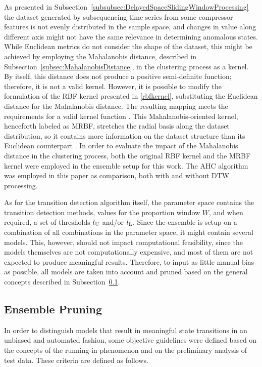 \documentclass[preprint,11pt,number]{elsarticle}
\begin{document}
As presented in Subsection~\ref{subsubsec:DelayedSpaceSlidingWindowProcessing} the dataset generated by subsequencing time series from some compressor features is not evenly distributed in the sample space, and changes in value along different axis might not have the same relevance in determining anomalous states. While Euclidean metrics do not consider the shape of the dataset, this might be achieved by employing the Mahalanobis distance, described in Subsection~\ref{subsec:MahalanobisDistance}, in the clustering process as a kernel. By itself, this distance does not produce a positive semi-definite function; therefore, it is not a valid kernel. However, it is possible to modify the formulation of the RBF kernel presented in \eqref{rbfkernel}, substituting the Euclidean distance for the Mahalanobis distance. The resulting mapping meets the requirements for a valid kernel function \cite{Wang2007}. This Mahalanobis-oriented kernel, henceforth labeled as MRBF, stretches the radial basis along the dataset distribution, so it contains more information on the dataset structure than its Euclidean counterpart \cite{Wang2007}. In order to evaluate the impact of the Mahalanobis distance in the clustering process, both the original RBF kernel and the MRBF kernel were employed in the ensemble setup for this work. The AHC algorithm was employed in this paper as comparison, both with and without DTW processing.

As for the transition detection algorithm itself, the parameter space contains the transition detection methods, values for the proportion window $W$, and when required, a set of thresholds $l\textsubscript{U}$ and/or $l\textsubscript{L}$. Since the ensemble is setup on a combination of all combinations in the parameter space, it might contain several models. This, however, should not impact computational feasibility, since the models themselves are not computationally expensive, and most of them are not expected to produce meaningful results. Therefore, to input as little manual bias as possible, all models are taken into account and pruned based on the general concepts described in Subsection~\ref{subsec:EnsemblePruning}.

\subsection{Ensemble Pruning}\label{subsec:EnsemblePruning}

In order to distinguish models that result in meaningful state transitions in an unbiased and automated fashion, some objective guidelines were defined based on the concepts of the running-in phenomenon and on the preliminary analysis of test data. These criteria are defined as follows.
\end{document}
